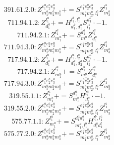 \documentclass[letterpaper,10pt,fleqn,leqno,onecolumn]{article}
\begin{document}
\begin{equation} \;\;\;\;\;\;  391.61.2.0: Z^{e_{1}^{a}e_{2}^{a}e_{3}^{a}}_{m_{1}^{a}m_{2}^{a}m_{3}^{a}}+=S^{e_{1}^{a}e_{2}^{a}e_{3}^{a}}_{m_{1}^{a}m_{2}^{a},l_{1}^{a}}Z^{l_{1}^{a}}_{m_{3}^{a}} \end{equation}
\begin{equation} \;\;\;\;\;\;  711.94.1.2: Z^{l_{1}^{a}}_{d_{1}^{a}}+=H^{l_{1}^{b},l_{1}^{a}}_{d_{1}^{b},d_{1}^{a}}S^{d_{1}^{b}}_{l_{1}^{b}}\cdot -1. \end{equation}
\begin{equation} \;\;\;\;\;\;  711.94.2.1: Z^{l_{1}^{a}}_{m_{1}^{a}}+=S^{d_{1}^{a}}_{m_{1}^{a}}Z^{l_{1}^{a}}_{d_{1}^{a}} \end{equation}
\begin{equation} \;\;\;\;\;\;  711.94.3.0: Z^{e_{1}^{a}e_{2}^{a}e_{3}^{a}}_{m_{1}^{a}m_{2}^{a}m_{3}^{a}}+=S^{e_{1}^{a}e_{2}^{a}e_{3}^{a}}_{m_{1}^{a}m_{2}^{a},l_{1}^{a}}Z^{l_{1}^{a}}_{m_{3}^{a}} \end{equation}
\begin{equation} \;\;\;\;\;\;  717.94.1.2: Z^{l_{1}^{a}}_{d_{1}^{a}}+=H^{l_{1}^{a},l_{2}^{a}}_{d_{1}^{a},d_{2}^{a}}S^{d_{2}^{a}}_{l_{2}^{a}}\cdot -1. \end{equation}
\begin{equation} \;\;\;\;\;\;  717.94.2.1: Z^{l_{1}^{a}}_{m_{1}^{a}}+=S^{d_{1}^{a}}_{m_{1}^{a}}Z^{l_{1}^{a}}_{d_{1}^{a}} \end{equation}
\begin{equation} \;\;\;\;\;\;  717.94.3.0: Z^{e_{1}^{a}e_{2}^{a}e_{3}^{a}}_{m_{1}^{a}m_{2}^{a}m_{3}^{a}}+=S^{e_{1}^{a}e_{2}^{a}e_{3}^{a}}_{m_{1}^{a}m_{2}^{a},l_{1}^{a}}Z^{l_{1}^{a}}_{m_{3}^{a}} \end{equation}
\begin{equation} \;\;\;\;\;\;  319.55.1.1: Z^{l_{1}^{a}}_{m_{1}^{a}}+=S^{d_{1}^{a}}_{m_{1}^{a}}H^{l_{1}^{a}}_{d_{1}^{a}}\cdot -1. \end{equation}
\begin{equation} \;\;\;\;\;\;  319.55.2.0: Z^{e_{1}^{a}e_{2}^{a}e_{3}^{a}}_{m_{1}^{a}m_{2}^{a}m_{3}^{a}}+=S^{e_{1}^{a}e_{2}^{a}e_{3}^{a}}_{m_{1}^{a}m_{2}^{a},l_{1}^{a}}Z^{l_{1}^{a}}_{m_{3}^{a}} \end{equation}
\begin{equation} \;\;\;\;\;\;  575.77.1.1: Z^{l_{1}^{a}}_{m_{1}^{a}}+=S^{d_{1}^{a}d_{1}^{b}}_{m_{1}^{a},l_{1}^{b}}H^{l_{1}^{b},l_{1}^{a}}_{d_{1}^{a}d_{1}^{b}} \end{equation}
\begin{equation} \;\;\;\;\;\;  575.77.2.0: Z^{e_{1}^{a}e_{2}^{a}e_{3}^{a}}_{m_{1}^{a}m_{2}^{a}m_{3}^{a}}+=S^{e_{1}^{a}e_{2}^{a}e_{3}^{a}}_{m_{1}^{a}m_{2}^{a},l_{1}^{a}}Z^{l_{1}^{a}}_{m_{3}^{a}} \end{equation}
\end{document}
